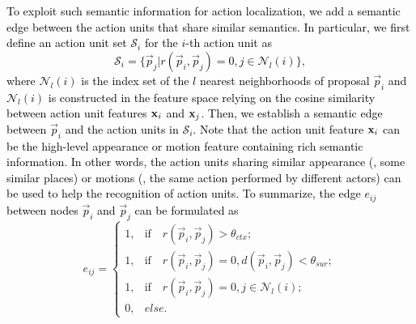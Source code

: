 \documentclass[10pt,journal,compsoc]{IEEEtran}
\def\hao{\textcolor{black}}
\begin{document}
	\hao{To exploit such semantic information for action localization, we add a semantic edge between the action units that share similar semantics. In particular, we first define an action unit set $\mathcal{S}_i$ for the $i$-th action unit as  
		\begin{equation}
		\mathcal{S}_i=\{\Vec{p}_{j}| r(\Vec{p}_{i}, \Vec{p}_{j})=0, j \in \mathcal{N}_l (i)\},
		\end{equation} 
		where $\mathcal{N}_l (i)$ is the index set of the $l$ nearest neighborhoods of proposal $\Vec{p}_{i}$ and $\mathcal{N}_l (i)$ is constructed in the feature space relying on the cosine similarity between action unit features ${\bf x}_{i}$ and ${\bf x}_{j}$. Then, we establish a semantic edge between $\Vec{p}_{i}$ and the action units in $\mathcal{S}_i$. Note that the action unit feature ${\bf x}_{i}$ can be the high-level appearance or motion feature containing rich semantic information. In other words, the action units sharing similar appearance (\eg, some similar places) or motions (\eg, the same action performed by different actors) can be used to help the recognition of action units. To summarize, the edge $e_{ij}$ between nodes $\Vec{p}_{i}$ and $\Vec{p}_{j}$ can be formulated as}	\begin{equation}
	\label{Eq:edge}
	e_{ij} =
	\begin{cases}
	1, & \mathrm{if}\quad r(\Vec{p}_{i}, \Vec{p}_{j})> \theta_{ctx}; \\
	1, &\mathrm{if}\quad r(\Vec{p}_{i}, \Vec{p}_{j})=0, d(\Vec{p}_{i}, \Vec{p}_{j}) < \theta_{sur}; \\
	1, &\mathrm{if}\quad r(\Vec{p}_{i}, \Vec{p}_{j})=0, j \in \mathcal{N}_l (i); \\
	0, & else.
	\end{cases}
	\end{equation}
	
\end{document}
